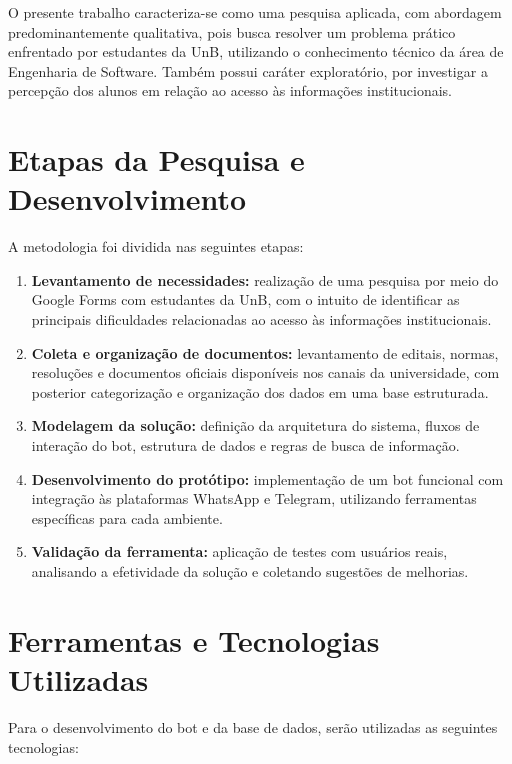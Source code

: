 O presente trabalho caracteriza-se como uma pesquisa aplicada, com abordagem predominantemente qualitativa, pois busca resolver um problema prático enfrentado por estudantes da UnB, utilizando o conhecimento técnico da área de Engenharia de Software. Também possui caráter exploratório, por investigar a percepção dos alunos em relação ao acesso às informações institucionais.

\section{Etapas da Pesquisa e Desenvolvimento}

A metodologia foi dividida nas seguintes etapas:

\begin{enumerate}
    \item \textbf{Levantamento de necessidades:} realização de uma pesquisa por meio do Google Forms com estudantes da UnB, com o intuito de identificar as principais dificuldades relacionadas ao acesso às informações institucionais.
    
    \item \textbf{Coleta e organização de documentos:} levantamento de editais, normas, resoluções e documentos oficiais disponíveis nos canais da universidade, com posterior categorização e organização dos dados em uma base estruturada.
    
    \item \textbf{Modelagem da solução:} definição da arquitetura do sistema, fluxos de interação do bot, estrutura de dados e regras de busca de informação.
    
    \item \textbf{Desenvolvimento do protótipo:} implementação de um bot funcional com integração às plataformas WhatsApp e Telegram, utilizando ferramentas específicas para cada ambiente.
    
    \item \textbf{Validação da ferramenta:} aplicação de testes com usuários reais, analisando a efetividade da solução e coletando sugestões de melhorias.
\end{enumerate}

\section{Ferramentas e Tecnologias Utilizadas}

Para o desenvolvimento do bot e da base de dados, serão utilizadas as seguintes tecnologias:


